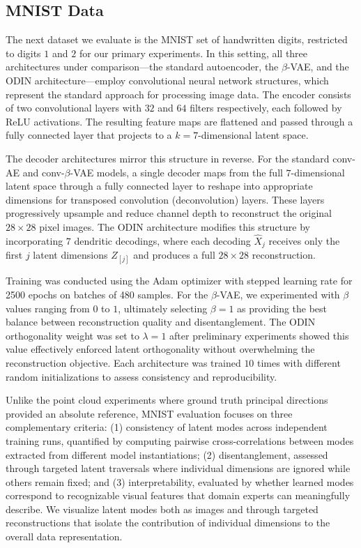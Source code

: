 \documentclass[twoside,11pt]{article}
\begin{document}
\subsection{MNIST Data}
The next dataset we evaluate is the MNIST set of handwritten digits, restricted to digits $1$ and $2$ for our primary experiments. In this setting, all three architectures under comparison—the standard autoencoder, the $\beta$-VAE, and the ODIN architecture—employ convolutional neural network structures, which represent the standard approach for processing image data. The encoder consists of two convolutional layers with $32$ and $64$ filters respectively, each followed by ReLU activations. The resulting feature maps are flattened and passed through a fully connected layer that projects to a $k=7$-dimensional latent space.

The decoder architectures mirror this structure in reverse. For the standard conv-AE and conv-$\beta$-VAE models, a single decoder maps from the full $7$-dimensional latent space through a fully connected layer to reshape into appropriate dimensions for transposed convolution (deconvolution) layers. These layers progressively upsample and reduce channel depth to reconstruct the original $28\times28$ pixel images. The ODIN architecture modifies this structure by incorporating $7$ dendritic decodings, where each decoding $\hat X_j$ receives only the first $j$ latent dimensions $Z_{[j]}$ and produces a full $28\times28$ reconstruction.

Training was conducted using the Adam optimizer with stepped learning rate for 2500 epochs on batches of 480 samples. For the $\beta$-VAE, we experimented with $\beta$ values ranging from $0$ to $1$, ultimately selecting $\beta=1$ as providing the best balance between reconstruction quality and disentanglement. The ODIN orthogonality weight was set to $\lambda=1$ after preliminary experiments showed this value effectively enforced latent orthogonality without overwhelming the reconstruction objective. Each architecture was trained $10$ times with different random initializations to assess consistency and reproducibility.

Unlike the point cloud experiments where ground truth principal directions provided an absolute reference, MNIST evaluation focuses on three complementary criteria: (1) consistency of latent modes across independent training runs, quantified by computing pairwise cross-correlations between modes extracted from different model instantiations; (2) disentanglement, assessed through targeted latent traversals where individual dimensions are ignored while others remain fixed; and (3) interpretability, evaluated by whether learned modes correspond to recognizable visual features that domain experts can meaningfully describe. We visualize latent modes both as images and through targeted reconstructions that isolate the contribution of individual dimensions to the overall data representation.
\end{document}
